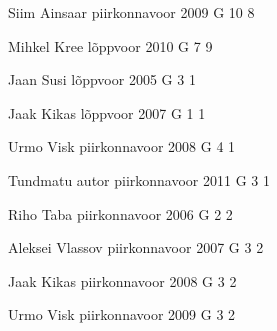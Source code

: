 \documentclass[11pt]{article}
\begin{document}
{Siim Ainsaar} %
{piirkonnavoor} %
{2009} %
{G 10} %
{8} %
{

\ifEngHint
\fi
}

{Mihkel Kree} %
{lõppvoor} %
{2010} %
{G 7} %
{9} %
{

\ifEngHint
\fi
}

{Jaan Susi} %
{lõppvoor} %
{2005} %
{G 3} %
{1} %
{

\ifEngHint
\fi
}

{Jaak Kikas} %
{lõppvoor} %
{2007} %
{G 1} %
{1} %
{

\ifEngHint
\fi
}

{Urmo Visk} %
{piirkonnavoor} %
{2008} %
{G 4} %
{1} %
{

\ifEngHint
\fi
}

{Tundmatu autor} %
{piirkonnavoor} %
{2011} %
{G 3} %
{1} %
{

\ifEngHint
\fi
}

{Riho Taba} %
{piirkonnavoor} %
{2006} %
{G 2} %
{2} %
{

\ifEngHint
\fi
}

{Aleksei Vlassov} %
{piirkonnavoor} %
{2007} %
{G 3} %
{2} %
{

\ifEngHint
\fi
}

{Jaak Kikas} %
{piirkonnavoor} %
{2008} %
{G 3} %
{2} %
{

\ifEngHint
\fi
}

{Urmo Visk} %
{piirkonnavoor} %
{2009} %
{G 3} %
{2} %
{

\ifEngHint
\fi
}
\end{document}
